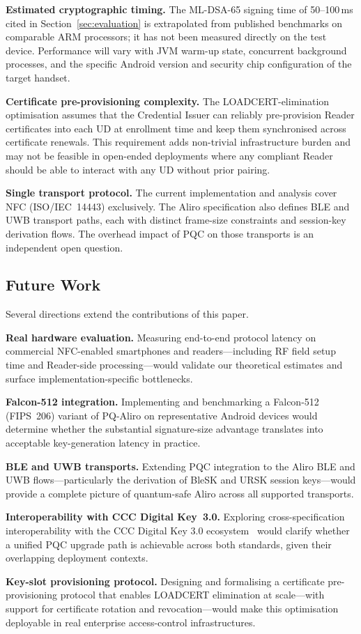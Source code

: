 \textbf{Estimated cryptographic timing.}
The ML-DSA-65 signing time of 50--100\,ms cited in Section~\ref{sec:evaluation} is extrapolated from published benchmarks on comparable ARM processors; it has not been measured directly on the test device. Performance will vary with JVM warm-up state, concurrent background processes, and the specific Android version and security chip configuration of the target handset.

\textbf{Certificate pre-provisioning complexity.}
The LOADCERT-elimination optimisation assumes that the Credential Issuer can reliably pre-provision Reader certificates into each UD at enrollment time and keep them synchronised across certificate renewals. This requirement adds non-trivial infrastructure burden and may not be feasible in open-ended deployments where any compliant Reader should be able to interact with any UD without prior pairing.

\textbf{Single transport protocol.}
The current implementation and analysis cover NFC (ISO/IEC~14443) exclusively. The Aliro specification also defines BLE and UWB transport paths, each with distinct frame-size constraints and session-key derivation flows. The overhead impact of PQC on those transports is an independent open question.

\subsection{Future Work}
\label{subsec:futurework}

Several directions extend the contributions of this paper.

\textbf{Real hardware evaluation.}
Measuring end-to-end protocol latency on commercial NFC-enabled smartphones and readers---including RF field setup time and Reader-side processing---would validate our theoretical estimates and surface implementation-specific bottlenecks.

\textbf{Falcon-512 integration.}
Implementing and benchmarking a Falcon-512 (FIPS~206) variant of PQ-Aliro on representative Android devices would determine whether the substantial signature-size advantage translates into acceptable key-generation latency in practice.

\textbf{BLE and UWB transports.}
Extending PQC integration to the Aliro BLE and UWB flows---particularly the derivation of BleSK and URSK session keys---would provide a complete picture of quantum-safe Aliro across all supported transports.

\textbf{Interoperability with CCC Digital Key~3.0.}
Exploring cross-specification interoperability with the CCC Digital Key 3.0 ecosystem~\cite{CCC:DigKey3} would clarify whether a unified PQC upgrade path is achievable across both standards, given their overlapping deployment contexts.

\textbf{Key-slot provisioning protocol.}
Designing and formalising a certificate pre-provisioning protocol that enables LOADCERT elimination at scale---with support for certificate rotation and revocation---would make this optimisation deployable in real enterprise access-control infrastructures.


